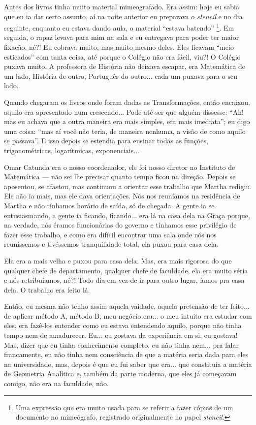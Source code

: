 \documentclass{hipatia}
\begin{document}
Antes dos livros tinha muito material mimeografado. Era assim: hoje eu
sabia que eu ia dar certo assunto, aí na noite anterior eu preparava o
\emph{stencil} e no dia seguinte, enquanto eu estava dando aula, o
material ``estava batendo'' \footnote{Uma expressão que era muito usada
  para se referir a fazer cópias de um documento no mimeógrafo,
  registrado originalmente no papel \emph{stencil}.}. Em seguida, o
rapaz levava para mim na sala e eu entregava para poder ter maior
fixação, né?! Eu cobrava muito, mas muito mesmo deles. Eles ficavam
``meio esticados'' com tanta coisa, até porque o Colégio não era fácil,
viu?! O Colégio puxava muito. A professora de História não deixava
escapar, era Matemática de um lado, História de outro, Português do
outro... cada um puxava para o seu lado.

Quando chegaram os livros onde foram dadas as Transformações, então
encaixou, aquilo era apresentado num crescendo... Pode até ser que
alguém dissesse: ``Ah! mas eu achava que a outra maneira era mais
simples, era mais imediata''; eu digo uma coisa: ``mas aí você não
teria, de maneira nenhuma, a visão de como aquilo se passava''. E isso
depois se estendia para ensinar todas as funções, trigonométricas,
logarítmicas, exponenciais...

Omar Catunda era o nosso coordenador, ele foi nosso diretor no Instituto
de Matemática --- não sei lhe precisar quanto tempo ficou na direção.
Depois se aposentou, se afastou, mas continuou a orientar esse trabalho
que Martha redigiu. Ele não ia mais, mas ele dava orientações. Nós nos
reuníamos na residência de Martha e não tínhamos horário de saída, só de
chegada. A gente ia se entusiasmando, a gente ia ficando, ficando... era
lá na casa dela na Graça porque, na verdade, nós éramos funcionárias do
governo e tínhamos esse privilégio de fazer esse trabalho, e como era
difícil encontrar uma sala onde nós nos reuníssemos e tivéssemos
tranquilidade total, ela puxou para casa dela.

Ela era a mais velha e puxou para casa dela. Mas, era mais rigorosa do
que qualquer chefe de departamento, qualquer chefe de faculdade, ela era
muito séria e nós retribuíamos, né?! Todo dia em vez de ir para outro
lugar, íamos pra casa dela. O trabalho era feito lá.

Então, eu mesma não tenho assim aquela vaidade, aquela pretensão de ter
feito... de aplicar método A, método B, meu negócio era... o meu intuito
era estudar com eles, era fazê-los entender como eu estava entendendo
aquilo, porque não tinha tempo nem de amadurecer. Eu... eu gostava da
experiência em si, eu gostava! Mas, dizer que eu tinha conhecimento
completo, eu não tinha nem... pra falar francamente, eu não tinha nem
consciência de que a matéria seria dada para eles na universidade, mas,
depois é que eu fui saber que era... que constituía a matéria de
Geometria Analítica e, também da parte moderna, que eles já começavam
comigo, não era na faculdade, não.
\end{document}
